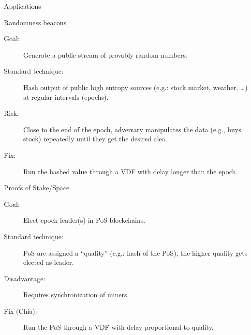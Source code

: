 \documentclass[aspectratio=169]{beamer}
\begin{document}
\begin{frame}{Applications}
  \begin{block}{Randomness beacons}
    \begin{description}
    \item[Goal:] Generate a public stream of provably random numbers.
    \item[Standard technique:] Hash output of public high entropy
      sources (e.g.: stock market, weather, \dots) at regular
      intervals (epochs).
    \item[Risk:] Close to the end of the epoch, adversary manipulates
      the data (e.g., buys stock) repeatedly until they get the
      desired alea.
    \item[Fix:] Run the hashed value through a VDF with delay longer
      than the epoch.
    \end{description}
  \end{block}

  \begin{block}{Proofs of Stake/Space}
    \begin{description}
    \item[Goal:] Elect epoch leader(s) in PoS blockchains.
    \item[Standard technique:] PoS are assigned a ``quality'' (e.g.:
      hash of the PoS), the higher quality gets elected as leader.
    \item[Disadvantage:] Requires synchronization of miners.
    \item[Fix (Chia):] Run the PoS through a VDF with delay
      proportional to quality.
    \end{description}
  \end{block}
\end{frame}

\end{document}
